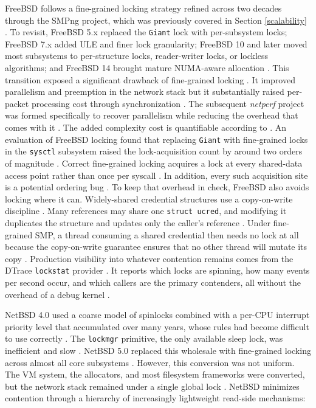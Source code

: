 FreeBSD follows a fine-grained locking strategy refined across two decades through the SMPng project, which was previously
covered in Section \ref{scalability} \parencite{freebsd_vs_dragonfly}. To revisit, FreeBSD 5.x replaced the \texttt{Giant}
lock with per-subsystem locks; FreeBSD 7.x added ULE and finer lock granularity; FreeBSD 10 and later moved most subsystems to
per-structure locks, reader-writer locks, or lockless algorithms; and FreeBSD 14 brought mature NUMA-aware allocation
\parencite{freebsd_vs_dragonfly}. This transition exposed a significant drawback of fine-grained locking \parencite{freebsd_netperf}.
It improved parallelism and preemption in the network stack but it substantially raised per-packet processing cost through
synchronization \parencite{freebsd_netperf}. The subsequent \textit{netperf} project was formed specifically to recover
parallelism while reducing the overhead that comes with it \parencite{freebsd_netperf}. The added complexity cost is quantifiable
according to \textcite{toy2010}. An evaluation of FreeBSD locking found that replacing \texttt{Giant} with fine-grained locks
in the \texttt{sysctl} subsystem raised the lock-acquisition count by around two orders of magnitude \parencite{toy2010}.
Correct fine-grained locking acquires a lock at every shared-data access point rather than once per syscall
\parencite{toy2010}. In addition, every such acquisition site is a potential ordering bug \parencite{toy2010}.
To keep that overhead in check, FreeBSD also avoids locking where it can. Widely-shared credential structures use a
copy-on-write discipline \parencite{freebsd_smp_lock_strategies}. Many references may share one \texttt{struct ucred},
and modifying it duplicates the structure and updates only the caller's reference \parencite{freebsd_smp_lock_strategies}.
Under fine-grained SMP, a thread consuming a shared credential then needs no lock at all because the copy-on-write guarantee
ensures that no other thread will mutate its copy \parencite{freebsd_smp_lock_strategies}. Production visibility into
whatever contention remains comes from the DTrace \texttt{lockstat} provider \parencite{freebsd_smp_lock_strategies}. It
reports which locks are spinning, how many events per second occur, and which callers are the primary contenders,
all without the overhead of a debug kernel \parencite{freebsd_smp_lock_strategies}.

NetBSD 4.0 used a coarse model of spinlocks combined with a per-CPU interrupt priority level that accumulated over many
years, whose rules had become difficult to use correctly \parencite{feyrer2008}. The \texttt{lockmgr} primitive, the only
available sleep lock, was inefficient and slow \parencite{feyrer2008}. NetBSD 5.0 replaced this wholesale with fine-grained
locking across almost all core subsystems \parencite{feyrer2008}. However, this conversion was not uniform. The
VM system, the allocators, and most filesystem frameworks were converted, but the network stack remained under a single
global lock \parencite{netbsd_smp_networking}. NetBSD minimizes contention through a hierarchy of increasingly lightweight
read-side mechanisms:

